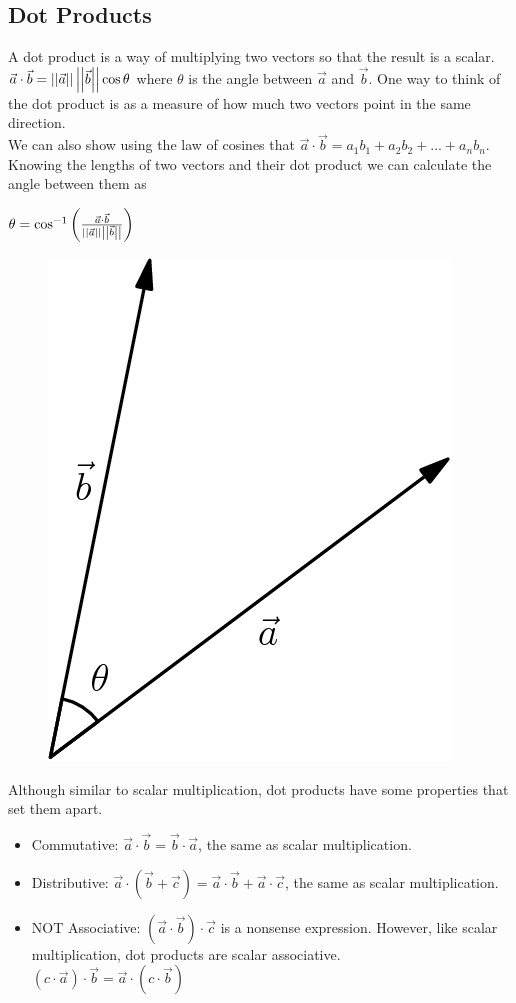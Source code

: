 \subsection{Dot Products}
\noindent
A dot product is a way of multiplying two vectors so that the result is a scalar. $\vec{a}\cdot\vec{b} = \left|\left|\vec{a}\right|\right|\left|\left|\vec{b}\right|\right|\cos{\theta}$ where $\theta$ is the angle between $\vec{a}$ and $\vec{b}$. One way to think of the dot product is as a measure of how much two vectors point in the same direction.\\
We can also show using the law of cosines that $\vec{a}\cdot\vec{b} = a_1b_1+a_2b_2+...+a_nb_n$.\\
Knowing the lengths of two vectors and their dot product we can calculate the angle between them as\\
\begin{center}
	$\theta = \cos^{-1}{\left(\frac{\vec{a}\cdot\vec{b}}{\left|\left|\vec{a}\right|\right|\left|\left|\vec{b}\right|\right|}\right)}$
\end{center}

\begin{figure}[h]
	\centering
	\includegraphics[scale=0.33]{Images/backgroundReview/DotProduct}
\end{figure}

\noindent
Although similar to scalar multiplication, dot products have some properties that set them apart.
\begin{itemize}
	\item Commutative: $\vec{a}\cdot\vec{b} = \vec{b}\cdot\vec{a}$, the same as scalar multiplication.
	\item Distributive: $\vec{a}\cdot\left(\vec{b}+\vec{c}\right) = \vec{a}\cdot\vec{b}+\vec{a}\cdot\vec{c}$, the same as scalar multiplication.
	\item NOT Associative: $\left(\vec{a}\cdot\vec{b}\right)\cdot\vec{c}$ is a nonsense expression. However, like scalar multiplication, dot products are scalar associative.\\ 
	$\left(c\cdot\vec{a}\right)\cdot\vec{b} = \vec{a}\cdot\left(c\cdot\vec{b}\right)$
\end{itemize}